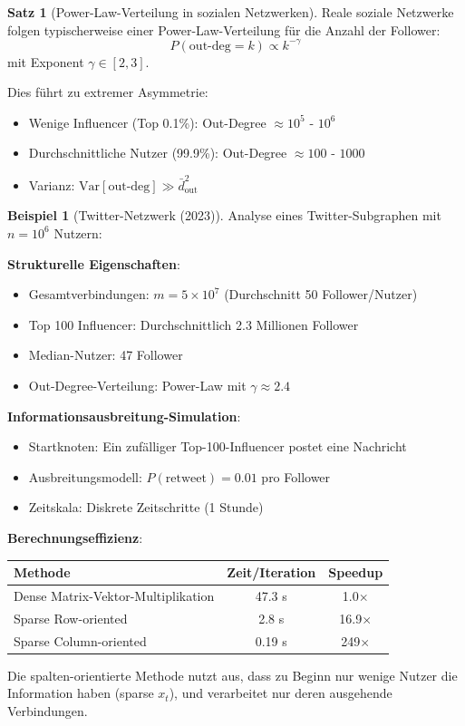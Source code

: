 ﻿\documentclass[a4paper,12pt]{report}
\theoremstyle{definition}
\newtheorem{beispiel}{Beispiel}
\newtheorem{satz}{Satz}
\begin{document}
	\begin{satz}[Power-Law-Verteilung in sozialen Netzwerken]
		Reale soziale Netzwerke folgen typischerweise einer Power-Law-Verteilung für die Anzahl der Follower:
		\[
		P(\text{out-deg} = k) \propto k^{-\gamma}
		\]
		mit Exponent $\gamma \in [2, 3]$.
		
		Dies führt zu extremer Asymmetrie:
		\begin{itemize}
			\item Wenige Influencer (Top 0.1\%): Out-Degree $\approx 10^5$ - $10^6$
			\item Durchschnittliche Nutzer (99.9\%): Out-Degree $\approx 100$ - $1000$
			\item Varianz: $\text{Var}[\text{out-deg}] \gg \bar{d}_{\text{out}}^2$
		\end{itemize}
	\end{satz}
	
	\begin{beispiel}[Twitter-Netzwerk (2023)]
		Analyse eines Twitter-Subgraphen mit $n = 10^6$ Nutzern:
		
		\textbf{Strukturelle Eigenschaften}:
		\begin{itemize}
			\item Gesamtverbindungen: $m = 5 \times 10^7$ (Durchschnitt 50 Follower/Nutzer)
			\item Top 100 Influencer: Durchschnittlich 2.3 Millionen Follower
			\item Median-Nutzer: 47 Follower
			\item Out-Degree-Verteilung: Power-Law mit $\gamma \approx 2.4$
		\end{itemize}
		
		\textbf{Informationsausbreitung-Simulation}:
		\begin{itemize}
			\item Startknoten: Ein zufälliger Top-100-Influencer postet eine Nachricht
			\item Ausbreitungsmodell: $P(\text{retweet}) = 0.01$ pro Follower
			\item Zeitskala: Diskrete Zeitschritte (1 Stunde)
		\end{itemize}
		
		\textbf{Berechnungseffizienz}:
		\begin{center}
			\begin{tabular}{|l|c|c|}
				\hline
				\textbf{Methode} & \textbf{Zeit/Iteration} & \textbf{Speedup} \\
				\hline
				Dense Matrix-Vektor-Multiplikation & 47.3 s & 1.0$\times$ \\
				Sparse Row-oriented & 2.8 s & 16.9$\times$ \\
				Sparse Column-oriented & 0.19 s & 249$\times$ \\
				\hline
			\end{tabular}
		\end{center}
		
		Die spalten-orientierte Methode nutzt aus, dass zu Beginn nur wenige Nutzer die Information haben (sparse $x_t$), und verarbeitet nur deren ausgehende Verbindungen.
	\end{beispiel}
	
\end{document}
